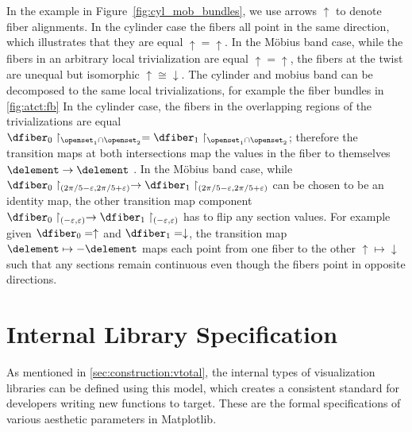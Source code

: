 \documentclass[journal]{IEEEtran}
\theoremstyle{definition}
\theoremstyle{remark}
\begin{document}
In the example in Figure~\ref{fig:cyl_mob_bundles}, we use arrows $\uparrow$ to denote fiber alignments. In the cylinder case the fibers all point in the same direction, which illustrates that they are equal $\uparrow=\uparrow$. In the Möbius band case, while the fibers in an arbitrary local trivialization are equal $\uparrow=\uparrow$, the fibers at the twist are unequal but isomorphic $\uparrow \cong \downarrow$. The cylinder and mobius band can be decomposed to the same local trivializations, for example the fiber bundles in \autoref{fig:atct:fb} In the cylinder case, the fibers in the overlapping regions of the trivializations are equal $\dfiber_0\restriction_{\openset_1\cap\openset_2} = \dfiber_{1}\restriction_{\openset_1\cap\openset_2}$; therefore the transition maps at both intersections map the values in the fiber to themselves $\delement\rightarrow\delement$ . In the Möbius band case, while $\dfiber_0\restriction_{(2\pi/5-\varepsilon, 2\pi/5+\varepsilon)}\to\dfiber_1\restriction_{(2\pi/5-\varepsilon, 2\pi/5+\varepsilon)}$ can be chosen to be an identity map, the other transition map component $\dfiber_0\restriction_{(-\varepsilon,\varepsilon)}\to\dfiber_1\restriction_{(-\varepsilon,\varepsilon)}$ has to flip any section values. For example given  $\dfiber_{0}=\uparrow$ and $\dfiber_{1}=\downarrow$, the transition map $\delement \mapsto -\delement$ maps each point from one fiber to the other $\uparrow \mapsto \downarrow$ such that any sections remain continuous even though the fibers point in opposite directions.


\section{Internal Library Specification}
As mentioned in \autoref{sec:construction:vtotal}, the internal types of visualization libraries can be defined using this model, which creates a consistent standard for developers writing new functions to target. These are the formal specifications of various aesthetic parameters in Matplotlib.
\end{document}

